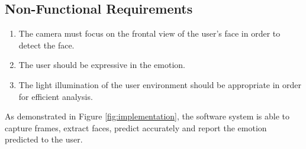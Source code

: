 \documentclass[master]{thesis-uestc}
\begin{document}
\subsection{Non-Functional Requirements}
\begin{enumerate}
    \item The camera must focus on the frontal view of the user's face in order to detect the face.
    \item The user should be expressive in the emotion.
    \item The light illumination of the user environment should be appropriate in order for efficient analysis.
\end{enumerate}
As demonstrated in Figure \ref{fig:implementation}, the software system is able to capture frames, extract faces, predict accurately and report the emotion predicted to the user.  
\end{document}
